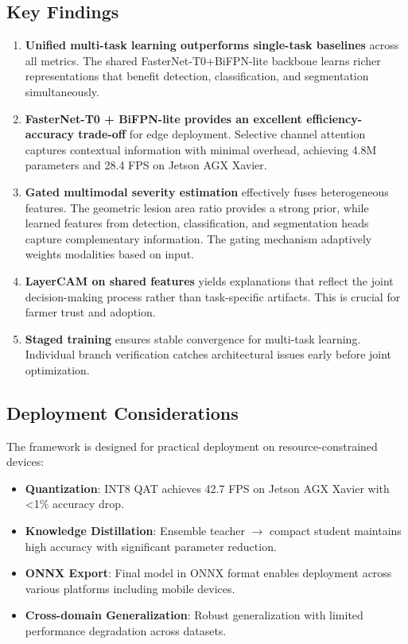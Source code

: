 \documentclass[10pt,a4paper,twocolumn]{article}
\begin{document}
\subsection{Key Findings}

\begin{enumerate}
    \item \textbf{Unified multi-task learning outperforms single-task baselines} across all metrics. The shared FasterNet-T0+BiFPN-lite backbone learns richer representations that benefit detection, classification, and segmentation simultaneously.
    \item \textbf{FasterNet-T0 + BiFPN-lite provides an excellent efficiency-accuracy trade-off} for edge deployment. Selective channel attention captures contextual information with minimal overhead, achieving 4.8M parameters and 28.4 FPS on Jetson AGX Xavier.
    \item \textbf{Gated multimodal severity estimation} effectively fuses heterogeneous features. The geometric lesion area ratio provides a strong prior, while learned features from detection, classification, and segmentation heads capture complementary information. The gating mechanism adaptively weights modalities based on input.
    \item \textbf{LayerCAM on shared features} yields explanations that reflect the joint decision-making process rather than task-specific artifacts. This is crucial for farmer trust and adoption.
    \item \textbf{Staged training} ensures stable convergence for multi-task learning. Individual branch verification catches architectural issues early before joint optimization.
\end{enumerate}

\subsection{Deployment Considerations}

The framework is designed for practical deployment on resource-constrained devices:
\begin{itemize}
    \item \textbf{Quantization}: INT8 QAT achieves 42.7 FPS on Jetson AGX Xavier with <1\% accuracy drop.
    \item \textbf{Knowledge Distillation}: Ensemble teacher $\rightarrow$ compact student maintains high accuracy with significant parameter reduction.
    \item \textbf{ONNX Export}: Final model in ONNX format enables deployment across various platforms including mobile devices.
    \item \textbf{Cross-domain Generalization}: Robust generalization with limited performance degradation across datasets.
\end{itemize}
\end{document}
